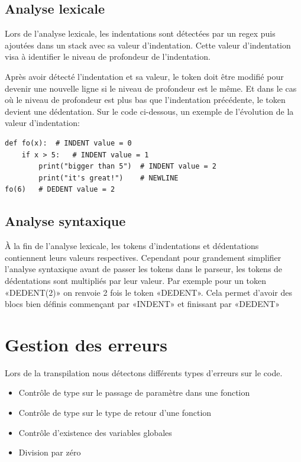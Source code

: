 \subsection*{Analyse lexicale}

Lors de l'analyse lexicale, les indentations sont détectées par un regex puis ajoutées dans un stack avec sa valeur d'indentation.
Cette valeur d'indentation visa à identifier le niveau de profondeur de l'indentation.

Après avoir détecté l'indentation et sa valeur, le token doit être modifié pour devenir une nouvelle ligne si le niveau de profondeur est le même.
Et dans le cas où le niveau de profondeur est plus bas que l'indentation précédente, le token devient une dédentation.
\newline
\newline
Sur le code ci-dessous, un exemple de l'évolution de la valeur d'indentation:
\lstset{language=Python}
\begin{lstlisting}
def fo(x):  # INDENT value = 0
    if x > 5:   # INDENT value = 1
        print("bigger than 5")  # INDENT value = 2
        print("it's great!")    # NEWLINE
fo(6)   # DEDENT value = 2
\end{lstlisting}

\subsection*{Analyse syntaxique}

À la fin de l'analyse lexicale, les tokens d'indentations et dédentations contiennent leurs valeurs respectives.
Cependant pour grandement simplifier l'analyse syntaxique avant de passer les tokens dans le parseur, les tokens de dédentations sont multipliés par leur valeur.
Par exemple pour un token «DEDENT(2)» on renvoie 2 fois le token «DEDENT».
Cela permet d'avoir des blocs bien définis commençant par «INDENT» et finissant par «DEDENT»

\section{Gestion des erreurs}

Lors de la transpilation nous détectons différents types d'erreurs sur le code.
\newline
\begin{itemize}
    \item Contrôle de type sur le passage de paramètre dans une fonction
    \item Contrôle de type sur le type de retour d'une fonction
    \item Contrôle d'existence des variables globales
    \item Division par zéro
\end{itemize}

